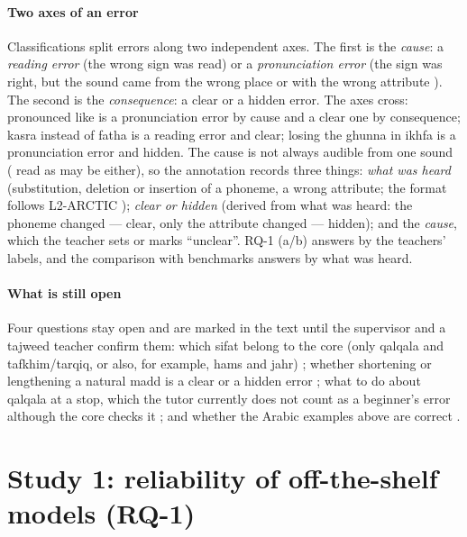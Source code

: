 \paragraph{Two axes of an error} Classifications split errors along two independent axes. The first is the
\emph{cause}: a \emph{reading error} (the wrong sign was read) or a \emph{pronunciation error} (the sign was
right, but the sound came from the wrong place or with the wrong attribute \cite{SRC-059}). The second is the
\emph{consequence}: a clear or a hidden error. The axes cross:  pronounced like  is a pronunciation
error by cause and a clear one by consequence; kasra instead of fatha is a reading error and clear; losing the
ghunna in ikhfa is a pronunciation error and hidden. The cause is not always audible from one sound ( read
as  may be either), so the annotation records three things: \emph{what was heard} (substitution, deletion
or insertion of a phoneme, a wrong attribute; the format follows L2-ARCTIC \cite{SRC-154}); \emph{clear or
hidden} (derived from what was heard: the phoneme changed --- clear, only the attribute changed --- hidden); and
the \emph{cause}, which the teacher sets or marks ``unclear''. RQ-1 (a/b) answers by the teachers' labels, and
the comparison with benchmarks answers by what was heard.

\paragraph{What is still open} Four questions stay open and are marked in the text until the supervisor and a
tajweed teacher confirm them: which sifat belong to the core (only qalqala and tafkhim/tarqiq, or also, for
example, hams and jahr) ; whether shortening or lengthening a natural madd is a clear or a hidden
error ; what to do about qalqala at a stop, which the tutor currently does not count as a
beginner's error although the core checks it ; and whether the Arabic examples above are correct
.

\section{Study 1: reliability of off-the-shelf models (RQ-1)}\label{sec:method-s1}

